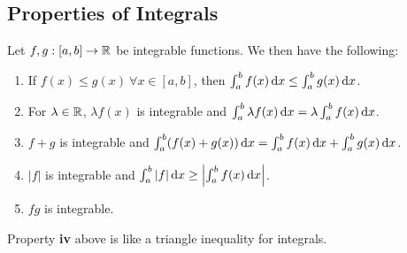 \documentclass[../main.tex]{subfiles}
\begin{document}
\subsection{Properties of Integrals}
\begin{lemma}
  Let $f, g: [a, b] \to \mathbb{R}$ be integrable functions. \label{integralProperties}
  We then have the following:
  \begin{enumerate}
    \item If $f(x) \leq g(x)\ \forall x \in [a, b]$, then $\int_{a}^{b} f(x) \d{x} \leq \int_{a}^{b} g(x) \d{x}$.
    \item For $\lambda \in \mathbb{R}$, $\lambda f(x)$ is integrable and $\int_{a}^{b} \lambda f(x) \d{x} = \lambda \int_{a}^{b} f(x) \d{x}$.
    \item $f + g$ is integrable and $\int_{a}^{b} (f(x) + g(x)) \d{x} = \int_{a}^{b} f(x) \d{x} + \int_{a}^{b} g(x) \d{x}$.
    \item $|f|$ is integrable and $\int_{a}^{b} |f| \d{x} \geq \abs{\int_{a}^{b} f(x) \d{x}}$.
    \item $fg$ is integrable.
  \end{enumerate}
\end{lemma}
\begin{remark}
  Property \textbf{iv} above is like a triangle inequality for integrals.
\end{remark}
\end{document}
